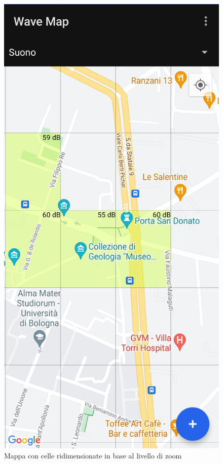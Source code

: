 \documentclass[11pt]{article}
\begin{document}
\begin{figure}[H]
\begin{minipage}[b]{0.25\textwidth}
    \end{minipage}
    \hspace*{1cm}
    \begin{minipage}[b]{0.25\textwidth}
      \includegraphics[width=\textwidth]{./img/overview/map_zoom2.jpg}
    \end{minipage}
    \caption{Mappa con celle ridimensionate in base al livello di zoom} \label{fig:overview_map}
\end{figure}
\end{document}
